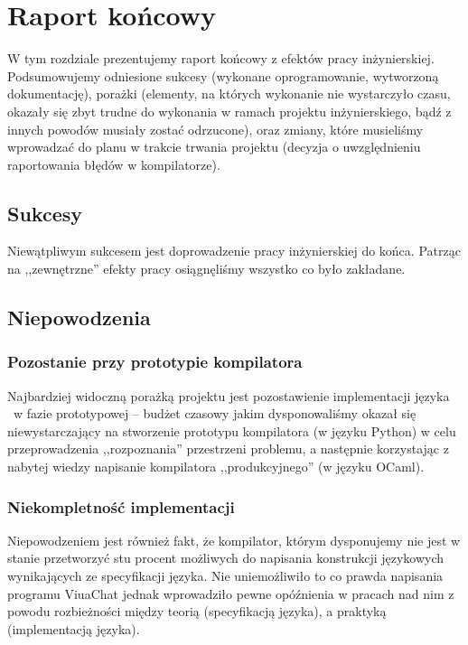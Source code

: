 \chapter{Raport końcowy}
\label{raport_koncowy}

W tym rozdziale prezentujemy raport końcowy z efektów pracy inżynierskiej.
Podsumowujemy odniesione sukcesy (wykonane oprogramowanie, wytworzoną dokumentację), porażki (elementy, na
których wykonanie nie wystarczyło czasu, okazały się zbyt trudne do wykonania w ramach projektu
inżynierskiego, bądź z innych powodów musiały zostać odrzucone), oraz zmiany, które musieliśmy wprowadzać do
planu w trakcie trwania projektu (decyzja o uwzględnieniu raportowania błędów w kompilatorze).

\section{Sukcesy}

Niewątpliwym sukcesem jest doprowadzenie pracy inżynierskiej do końca. Patrząc
na ,,zewnętrzne'' efekty pracy osiągnęliśmy wszystko co było zakładane.

\section{Niepowodzenia}

\subsection{Pozostanie przy prototypie kompilatora}

Najbardziej widoczną porażką projektu jest pozostawienie implementacji języka
\ViuAct\ w fazie prototypowej -- budżet czasowy jakim dysponowaliśmy okazał się
niewystarczający na stworzenie prototypu kompilatora (w języku Python) w celu
przeprowadzenia ,,rozpoznania'' przestrzeni problemu, a następnie korzystając z
nabytej wiedzy napisanie kompilatora ,,produkcyjnego'' (w języku OCaml).

\subsection{Niekompletność implementacji}

Niepowodzeniem jest również fakt, że kompilator, którym dysponujemy nie jest w
stanie przetworzyć stu procent możliwych do napisania konstrukcji językowych
wynikających ze specyfikacji języka. Nie uniemożliwiło to co prawda napisania
programu ViuaChat jednak wprowadziło pewne opóźnienia w pracach nad nim z powodu
rozbieżności między teorią (specyfikacją języka), a praktyką (implementacją
języka).

